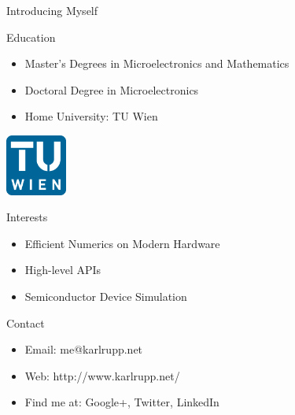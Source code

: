 

\begin{frame}{Introducing Myself}
   \begin{block}{Education}
    \begin{itemize}
     \item Master's Degrees in Microelectronics and Mathematics
     \item Doctoral Degree in Microelectronics
     \item Home University: TU Wien
    \end{itemize}

   \vspace*{-2cm}
   \begin{flushright}
     \includegraphics[width=0.15\textwidth]{figures/TU-Signet}
   \end{flushright}

   \end{block}



   \begin{block}{Interests}
    \begin{itemize}
     \item Efficient Numerics on Modern Hardware
     \item High-level APIs
     \item Semiconductor Device Simulation
    \end{itemize}

   \end{block}

   \begin{block}{Contact}
    \begin{itemize}
     \item Email: me@karlrupp.net
     \item Web: http://www.karlrupp.net/
     \item Find me at: Google+, Twitter, LinkedIn
    \end{itemize}
   \end{block}

\end{frame}


